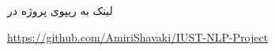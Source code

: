 \Section
{لینک به ریپوی پروژه در 
}
{
\begin{center}
\url{https://github.com/AmiriShavaki/IUST-NLP-Project}
\end{center}
}